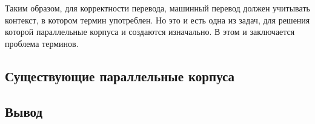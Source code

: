 Таким образом, для корректности перевода, машинный перевод должен учитывать контекст, в котором термин употреблен.
Но это и есть одна из задач, для решения которой параллельные корпуса и создаются изначально.
В этом и заключается проблема терминов.




\subsection{Существующие параллельные корпуса}


\subsection{Вывод}
